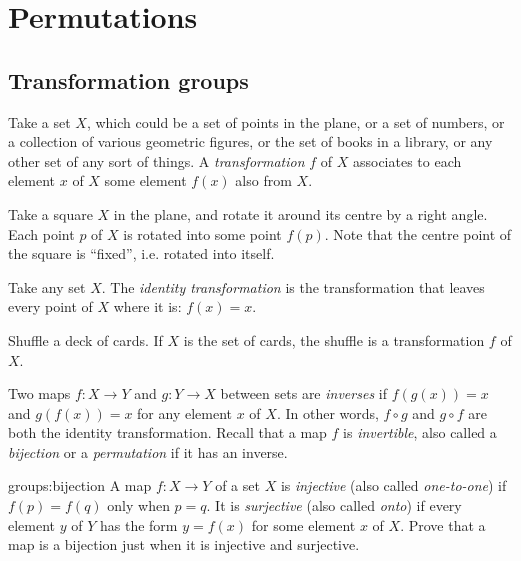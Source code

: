 \chapter{Permutations}

\section{Transformation groups}

Take a set \(X\), which could be a set of points in the plane, or a set of numbers, or a collection of various geometric figures, or the set of books in a library, or any other set of any sort of things.
A \emph{transformation} \(f\) of \(X\) associates to each element \(x\) of \(X\) some element \(f(x)\) also from \(X\).

\begin{example}
Take a square \(X\) in the plane, and rotate it around its centre by a right angle.
Each point \(p\) of \(X\) is rotated into some point \(f(p)\).
Note that the centre point of the square is ``fixed'', i.e. rotated into itself.
\end{example}
\begin{example}
Take any set \(X\).
The \emph{identity transformation} is the transformation that leaves every point of \(X\) where it is: \(f(x)=x\).
\end{example}
\begin{example}
Shuffle a deck of cards.
If \(X\) is the set of cards, the shuffle is a transformation \(f\) of \(X\).
\end{example}

Two maps \(f \colon X \to Y\) and \(g \colon Y \to X\) between sets are \emph{inverses} if \(f(g(x))=x\) and \(g(f(x))=x\) for any element \(x\) of \(X\).
In other words, \(f \circ g\) and \(g \circ f\) are both the identity transformation.
Recall that a map \(f\) is \emph{invertible}, also called a \emph{bijection} or a \emph{permutation} if it has an inverse.

\begin{problem}{groups:bijection}
A map \(f \colon X \to Y\) of a set \(X\) is \emph{injective} (also called \emph{one-to-one}) if \(f(p)=f(q)\) only when \(p=q\).
It is \emph{surjective} (also called \emph{onto}) if every element \(y\) of \(Y\) has the form \(y=f(x)\) for some element \(x\) of \(X\).
Prove that a map is a bijection just when it is injective and surjective.
\end{problem}

